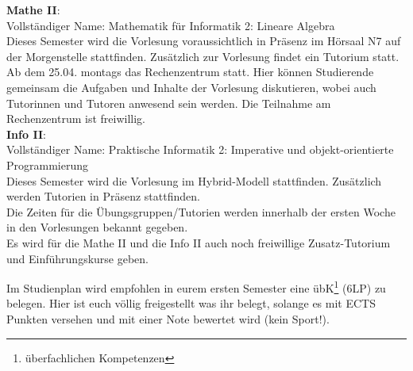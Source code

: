 \textbf{Mathe II}:\\
Vollständiger Name: Mathematik für Informatik 2: Lineare Algebra\\
Dieses Semester wird die Vorlesung voraussichtlich in Präsenz im Hörsaal N7 auf der Morgenstelle stattfinden.
Zusätzlich zur Vorlesung findet ein Tutorium statt. \\
Ab dem 25.04. montags das Rechenzentrum statt. Hier können Studierende gemeinsam die Aufgaben und Inhalte der Vorlesung diskutieren,
wobei auch Tutorinnen und Tutoren anwesend sein werden. Die Teilnahme am Rechenzentrum ist freiwillig.\\

\textbf{Info II}:\\
Vollständiger Name: Praktische Informatik 2: Imperative und objekt-orientierte Programmierung\\
Dieses Semester wird die Vorlesung im Hybrid-Modell stattfinden. Zusätzlich werden Tutorien in Präsenz stattfinden.\\

Die Zeiten für die Übungsgruppen/Tutorien werden innerhalb der ersten Woche in den Vorlesungen bekannt gegeben.\\
Es wird für die Mathe II und die Info II auch noch freiwillige Zusatz-Tutorium und Einführungskurse geben.

Im Studienplan wird empfohlen in eurem ersten Semester eine übK\footnote{überfachlichen Kompetenzen} (6LP) zu belegen. Hier ist euch völlig freigestellt was ihr belegt, solange es mit ECTS Punkten versehen und mit einer Note bewertet wird (kein Sport!).\\
